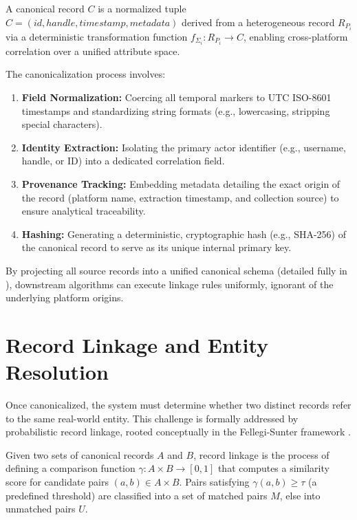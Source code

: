\begin{definition}
\label{def:canonical-representation}
A canonical record $C$ is a normalized tuple $C = (id, handle, timestamp, metadata)$ derived from a heterogeneous record $R_{P_i}$ via a deterministic transformation function $f_{\Sigma_i} : R_{P_i} \rightarrow C$, enabling cross-platform correlation over a unified attribute space.
\end{definition}

The canonicalization process involves:
\begin{enumerate}
    \item \textbf{Field Normalization:} Coercing all temporal markers to UTC ISO-8601 timestamps and standardizing string formats (e.g., lowercasing, stripping special characters).
    \item \textbf{Identity Extraction:} Isolating the primary actor identifier (e.g., username, handle, or ID) into a dedicated correlation field.
    \item \textbf{Provenance Tracking:} Embedding metadata detailing the exact origin of the record (platform name, extraction timestamp, and collection source) to ensure analytical traceability.
    \item \textbf{Hashing:} Generating a deterministic, cryptographic hash (e.g., SHA-256) of the canonical record to serve as its unique internal primary key.
\end{enumerate}
By projecting all source records into a unified canonical schema (detailed fully in ), downstream algorithms can execute linkage rules uniformly, ignorant of the underlying platform origins.

\section{Record Linkage and Entity Resolution}
\label{sec:foundations-linkage}
Once canonicalized, the system must determine whether two distinct records refer to the same real-world entity. This challenge is formally addressed by probabilistic record linkage, rooted conceptually in the Fellegi-Sunter framework \cite{fellegi1969theory}.

\begin{definition}
\label{def:record-linkage}
Given two sets of canonical records $A$ and $B$, record linkage is the process of defining a comparison function $\gamma: A \times B \rightarrow [0,1]$ that computes a similarity score for candidate pairs $(a, b) \in A \times B$. Pairs satisfying $\gamma(a,b) \ge \tau$ (a predefined threshold) are classified into a set of matched pairs $M$, else into unmatched pairs $U$.
\end{definition}

